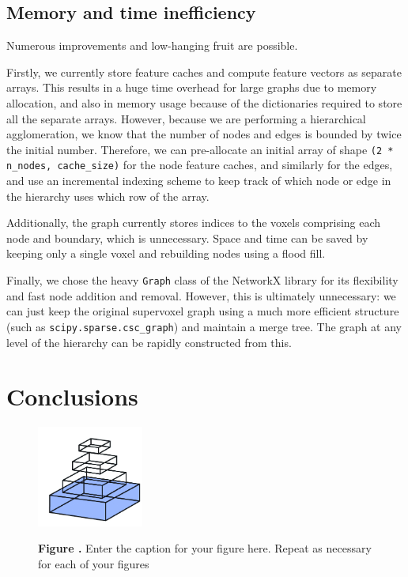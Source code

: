 \documentclass{frontiersSCNS} %
\begin{document}
\subsection{Memory and time inefficiency}

Numerous improvements and low-hanging fruit are possible.

Firstly, we currently store feature caches and compute feature vectors as separate arrays.
This results in a huge time overhead for large graphs due to memory allocation, and also in memory usage because of the dictionaries required to store all the separate arrays.
However, because we are performing a hierarchical agglomeration, we know that the number of nodes and edges is bounded by twice the initial number.
Therefore, we can pre-allocate an initial array of shape \texttt{(2 * n\_nodes, cache\_size)} for the node feature caches, and similarly for the edges, and use an incremental indexing scheme to keep track of which node or edge in the hierarchy uses which row of the array.

Additionally, the graph currently stores indices to the voxels comprising each node and boundary, which is unnecessary.
Space and time can be saved by keeping only a single voxel and rebuilding nodes using a flood fill.

Finally, we chose the heavy \texttt{Graph} class of the NetworkX library for its flexibility and fast node addition and removal.
However, this is ultimately unnecessary: we can just keep the original supervoxel graph using a much more efficient structure (such as \texttt{scipy.sparse.csc\_graph}) and maintain a merge tree.
The graph at any level of the hierarchy can be rapidly constructed from this.

\section{Conclusions}


\begin{figure}
\begin{center}
\includegraphics[width=3.5cm]{logo1}%
\end{center}
 \textbf{\label{fig:01} Figure .}{ Enter the caption for your figure here.  Repeat as  necessary for each of your figures }
\end{figure}
\end{document}
